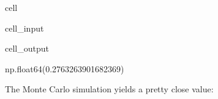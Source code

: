 \documentclass[letterpaper,10pt,english]{jupyterBook}
\begin{document}
\begin{sphinxuseclass}{cell}\begin{sphinxVerbatimInput}

\begin{sphinxuseclass}{cell_input}
\begin{sphinxVerbatim}[commandchars=\\\{\}]
\end{sphinxVerbatim}

\end{sphinxuseclass}\end{sphinxVerbatimInput}
\begin{sphinxVerbatimOutput}

\begin{sphinxuseclass}{cell_output}
\begin{sphinxVerbatim}[commandchars=\\\{\}]
np.float64(0.2763263901682369)
\end{sphinxVerbatim}

\end{sphinxuseclass}\end{sphinxVerbatimOutput}

\end{sphinxuseclass}
\sphinxAtStartPar
The Monte Carlo simulation yields a pretty close value:
\end{document}
